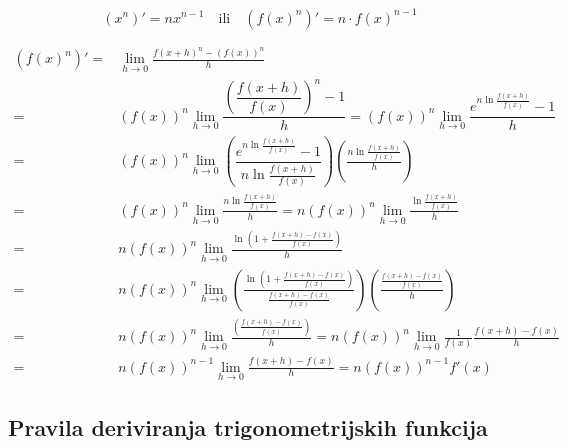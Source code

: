 \pagebreak

\begin{proposition}
    $$
        (x^{n})' = nx^{n-1}\quad \text{ili} \quad (f(x)^{n})' = n\cdot f(x)^{n-1}
    $$
\end{proposition}

\begin{align*}
    (f(x)^{n})' =& \lim_{h\to 0} \frac{f(x+h)^n - (f(x))^n}{h}\\
    =& (f(x))^n \lim_{h\to 0} \dfrac{\left(\dfrac{f(x+h)}{f(x)}\right)^n - 1}{h}
    = (f(x))^n \lim_{h\to 0} \dfrac{e^{n \ln \frac{f(x+h)}{f(x)}} - 1}{h}\\
    =& (f(x))^n \lim_{h\to 0} \left(\dfrac{e^{n \ln \frac{f(x+h)}{f(x)}} - 1}{n \ln \frac{f(x+h)}{f(x)}}\right)\left(\frac{n \ln \frac{f(x+h)}{f(x)}}{h}\right)\\
    =& (f(x))^n \lim_{h\to 0} \frac{n \ln \frac{f(x+h)}{f(x)}}{h}
    = n(f(x))^n \lim_{h\to 0} \frac{\ln \frac{f(x+h)}{f(x)}}{h}\\
    =& n(f(x))^n \lim_{h\to 0} \frac{\ln \left(1 + \frac{f(x+h) - f(x)}{f(x)} \right)}{h}\\
    =& n(f(x))^n \lim_{h\to 0} \left(\frac{\ln \left(1 + \frac{f(x+h) - f(x)}{f(x)} \right)}{\frac{f(x+h) - f(x)}{f(x)}} \right) \left( \frac{\frac{f(x+h) - f(x)}{f(x)}}{h} \right)\\
    =& n(f(x))^n \lim_{h\to 0} \frac{\left(\frac{f(x+h)-f(x)}{f(x)}\right)}{h}
    = n(f(x))^n \lim_{h\to 0} \frac{1}{f(x)}\frac{f(x+h)-f(x)}{h}\\
    =& n(f(x))^{n-1} \lim_{h\to 0} \frac{f(x+h)-f(x)}{h} = n(f(x))^{n-1} f'(x)
\end{align*}

\subsection{Pravila deriviranja trigonometrijskih funkcija}


